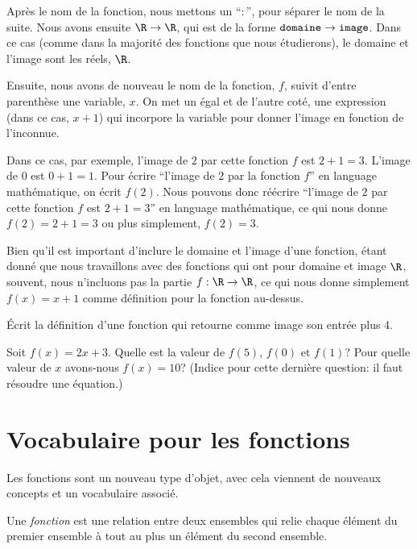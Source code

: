 Après le nom de la fonction, nous mettons un ``$:$'', pour séparer le nom de la suite. Nous avons ensuite $\R \to \R$, qui est de la forme $\text{\texttt{domaine}} \to \text{\texttt{image}}$. Dans ce cas (comme dans la majorité des fonctions que nous étudierons), le domaine et l'image sont les réels, $\R$.

Ensuite, nous avons de nouveau le nom de la fonction, $f$, suivit d'entre parenthèse une variable, $x$. On met un égal et de l'autre coté, une expression (dans ce cas, $x+1$) qui incorpore la variable pour donner l'image en fonction de l'inconnue.

Dans ce cas, par exemple, l'image de $2$ par cette fonction $f$ est $2+1 = 3$. L'image de $0$ est $0+1 = 1$. Pour écrire ``l'image de $2$ par la fonction $f$'' en language mathématique, on écrit $f(2)$. Nous pouvons donc réécrire ``l'image de $2$ par cette fonction $f$ est $2+1 = 3$'' en language mathématique, ce qui nous donne $f(2) = 2+1 = 3$ ou plus simplement, $f(2) = 3$.

Bien qu'il est important d'inclure le domaine et l'image d'une fonction, étant donné que nous travaillons avec des fonctions qui ont pour domaine et image $\R$, souvent, nous n'incluons pas la partie $f: \R \to \R$, ce qui nous donne simplement $f(x) = x + 1$ comme définition pour la fonction au-dessus.

\vspace{1em}

\begin{exercice}
    Écrit la définition d'une fonction qui retourne comme image son entrée plus 4.
\end{exercice}

\begin{exercice}
    Soit $f(x) = 2x + 3$. Quelle est la valeur de $f(5)$, $f(0)$ et $f(1)$? Pour quelle valeur de $x$ avons-nous $f(x) = 10$? (Indice pour cette dernière question: il faut résoudre une équation.)
\end{exercice}

\section{Vocabulaire pour les fonctions}

Les fonctions sont un nouveau type d'objet, avec cela viennent de nouveaux concepts et un vocabulaire associé.

\begin{definition}
    Une \emph{fonction} est une relation entre deux ensembles qui relie chaque élément du premier ensemble à tout au plus un élément du second ensemble.
\end{definition}

